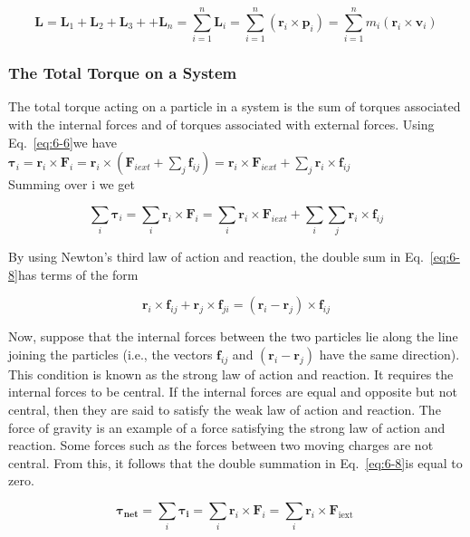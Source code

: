 \documentclass[10pt]{article}
\numberwithin{equation}{section}
\begin{document}
$$
\mathbf{L}=\mathbf{L}_{1}+\mathbf{L}_{2}+\mathbf{L}_{3}++\mathbf{L}_{n}=\sum_{i=1}^{n} \mathbf{L}_{i}=\sum_{i=1}^{n}\left(\mathbf{r}_{i} \times \mathbf{p}_{i}\right)=\sum_{i=1}^{n} m_{i}\left(\mathbf{r}_{i} \times \mathbf{v}_{i}\right)
$$

\subsubsection{The Total Torque on a System}\label{sec:6-3-10}
The total torque acting on a particle in a system is the sum of torques associated with the internal forces and of torques associated with external forces. Using Eq.~\eqref{eq:6-6}we have\\
$\boldsymbol{\tau}_{i}=\mathbf{r}_{i} \times \mathbf{F}_{i}=\mathbf{r}_{i} \times\left(\mathbf{F}_{i e x t}+\sum_{j} \mathbf{f}_{i j}\right)=\mathbf{r}_{i} \times \mathbf{F}_{i e x t}+\sum_{j} \mathbf{r}_{i} \times \mathbf{f}_{i j}$\\
Summing over i we get


\begin{equation}
\sum_{i} \boldsymbol{\tau}_{i}=\sum_{i} \mathbf{r}_{i} \times \mathbf{F}_{i}=\sum_{i} \mathbf{r}_{i} \times \mathbf{F}_{i e x t}+\sum_{i} \sum_{j} \mathbf{r}_{i} \times \mathbf{f}_{i j} \label{eq:6-8}
\end{equation}


By using Newton's third law of action and reaction, the double sum in Eq.~\eqref{eq:6-8}has terms of the form

$$
\mathbf{r}_{i} \times \mathbf{f}_{i j}+\mathbf{r}_{j} \times \mathbf{f}_{j i}=\left(\mathbf{r}_{i}-\mathbf{r}_{j}\right) \times \mathbf{f}_{i j}
$$

Now, suppose that the internal forces between the two particles lie along the line joining the particles (i.e., the vectors $\mathbf{f}_{i j}$ and $\left(\mathbf{r}_{i}-\mathbf{r}_{j}\right)$ have the same direction). This condition is known as the strong law of action and reaction. It requires the internal forces to be central. If the internal forces are equal and opposite but not central, then they are said to satisfy the weak law of action and reaction. The force of gravity is an example of a force satisfying the strong law of action and reaction. Some forces such as the forces between two moving charges are not central. From this, it follows that the double summation in Eq.~\eqref{eq:6-8}is equal to zero.

$$
\boldsymbol{\tau}_{\boldsymbol{n e t}}=\sum_{i} \boldsymbol{\tau}_{\boldsymbol{i}}=\sum_{i} \mathbf{r}_{i} \times \mathbf{F}_{i}=\sum_{i} \mathbf{r}_{i} \times \mathbf{F}_{\text {iext }}
$$
\end{document}
